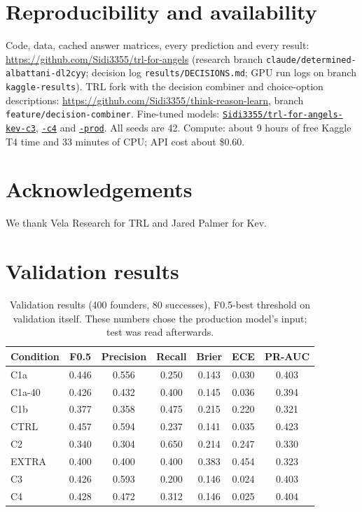\documentclass{article}
\newcommand{\cond}[1]{#1}
\begin{document}
\section*{Reproducibility and availability}

Code, data, cached answer matrices, every prediction and every result:
\url{https://github.com/Sidi3355/trl-for-angels} (research branch
\texttt{claude/determined-albattani-dl2cyy}; decision log \texttt{results/DECISIONS.md}; GPU run
logs on branch \texttt{kaggle-results}). TRL fork with the decision combiner and choice-option
descriptions: \url{https://github.com/Sidi3355/think-reason-learn}, branch
\texttt{feature/decision-combiner}. Fine-tuned models:
\href{https://huggingface.co/Sidi3355/trl-for-angels-kev-c3}{\texttt{Sidi3355/trl-for-angels-kev-c3}},
\href{https://huggingface.co/Sidi3355/trl-for-angels-kev-c4}{\texttt{-c4}} and
\href{https://huggingface.co/Sidi3355/trl-for-angels-kev-prod}{\texttt{-prod}}. All seeds are 42.
Compute: about 9 hours of free Kaggle T4 time and 33 minutes of CPU; API cost about \$0.60.

\section*{Acknowledgements}

We thank Vela Research for TRL and Jared Palmer for Kev.




\clearpage
\appendix

\section{Validation results}

\begin{table}[h]
\centering\small
\caption{Validation results (400 founders, 80 successes), F0.5-best threshold on validation itself.
These numbers chose the production model's input; test was read afterwards.}
\label{tab:val}
\begin{tabular}{@{}l c c c c c c@{}}
\toprule
Condition & F0.5 & Precision & Recall & Brier & ECE & PR-AUC \\
\midrule
\cond{C1a} & 0.446 & 0.556 & 0.250 & 0.143 & 0.030 & 0.403 \\
\cond{C1a-40} & 0.426 & 0.432 & 0.400 & 0.145 & 0.036 & 0.394 \\
\cond{C1b} & 0.377 & 0.358 & 0.475 & 0.215 & 0.220 & 0.321 \\
\cond{CTRL} & 0.457 & 0.594 & 0.237 & 0.141 & 0.035 & 0.423 \\
\cond{C2} & 0.340 & 0.304 & 0.650 & 0.214 & 0.247 & 0.330 \\
\cond{EXTRA} & 0.400 & 0.400 & 0.400 & 0.383 & 0.454 & 0.323 \\
\cond{C3} & 0.426 & 0.593 & 0.200 & 0.146 & 0.024 & 0.403 \\
\cond{C4} & 0.428 & 0.472 & 0.312 & 0.146 & 0.025 & 0.404 \\
\bottomrule
\end{tabular}
\end{table}
\end{document}
